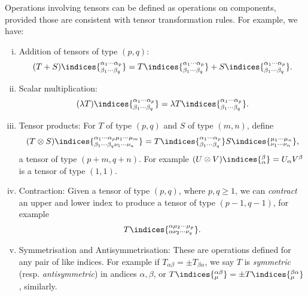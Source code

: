 \documentclass[12pt]{article}
\begin{document}
Operations involving tensors can be defined as operations on components, provided those are consistent with tensor transformation rules. For example, we have:
\begin{enumerate}[(i)]
	\item Addition of tensors of type $(p, q)$:
		\[
			(T + S)\indices{^{\alpha_1\cdots\alpha_p}_{\beta_1\cdots\beta_q}} = T\indices{^{\alpha_1\cdots\alpha_p}_{\beta_1\cdots\beta_q}} + S\indices{^{\alpha_1\cdots\alpha_p}_{\beta_1\cdots\beta_q}}.
		\]
	\item Scalar multiplication:
		\[
			(\lambda T)\indices{^{\alpha_1\cdots\alpha_p}_{\beta_1\cdots\beta_q}} = \lambda T\indices{^{\alpha_1\cdots\alpha_p}_{\beta_1\cdots\beta_q}}.
		\]
	\item Tensor products: For $T$ of type $(p, q)$ and $S$ of type $(m, n)$, define
		\[
			(T \otimes S)\indices{^{\alpha_1\cdots\alpha_p\mu_1\cdots\mu_m}_{\beta_1\cdots\beta_q\nu_1\cdots\nu_n}} = T\indices{^{\alpha_1\cdots\alpha_p}_{\beta_1\cdots\beta_q}}S\indices{^{\mu_1\cdots\mu_n}_{\nu_1\cdots\nu_n}},
		\]
		a tensor of type $(p+m, q+n)$. For example $(U \otimes V)\indices{_\alpha^\beta} = U_\alpha V^\beta$ is a tensor of type $(1, 1)$.
	\item Contraction: Given a tensor of type $(p, q)$, where $p, q \geq 1$, we can \emph{contract} an upper and lower index to produce a tensor of type $(p-1, q-1)$, for example
		\[
			T\indices{^{\alpha\mu_2\cdots\mu_p}_{\alpha\nu_2\cdots\nu_q}}.
		\]
	\item Symmetrisation and Antisymmetrisation: These are operations defined for any pair of like indices. For example if $T_{\alpha\beta} = \pm T_{\beta\alpha}$, we say $T$ is \emph{symmetric} (resp. \emph{antisymmetric}) in andices $\alpha, \beta$, or $T\indices{_\mu^{\alpha\beta}} = \pm T\indices{_\mu^{\beta\alpha}}$, similarly.


\end{enumerate}
\end{document}
